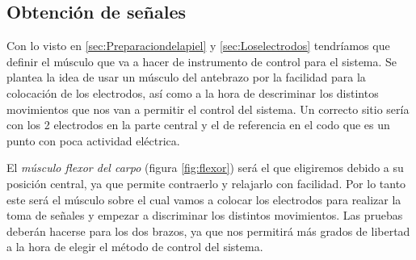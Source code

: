 \subsection{Obtención de señales}

Con lo visto en \ref{sec:Preparaciondelapiel} y \ref{sec:Loselectrodos} tendríamos que definir el músculo que va a hacer de instrumento de control para el sistema. Se plantea la idea de usar un músculo del antebrazo por la facilidad para la colocación de los electrodos, así como a la hora de descriminar los distintos movimientos que nos van a permitir el control del sistema. Un correcto sitio sería con los 2 electrodos en la parte central y el de referencia en el codo que es un punto con poca actividad eléctrica.\newline 

El \textit{músculo flexor del carpo} (figura \ref{fig:flexor}) será  el que eligiremos debido a su posición central, ya que permite contraerlo y relajarlo con facilidad. \newline Por lo tanto este será el músculo sobre el cual vamos a colocar los electrodos para realizar la toma de señales y empezar a discriminar los distintos movimientos. Las pruebas deberán hacerse para los dos brazos, ya que nos permitirá más grados de libertad a la hora de elegir el método de control del sistema.  


